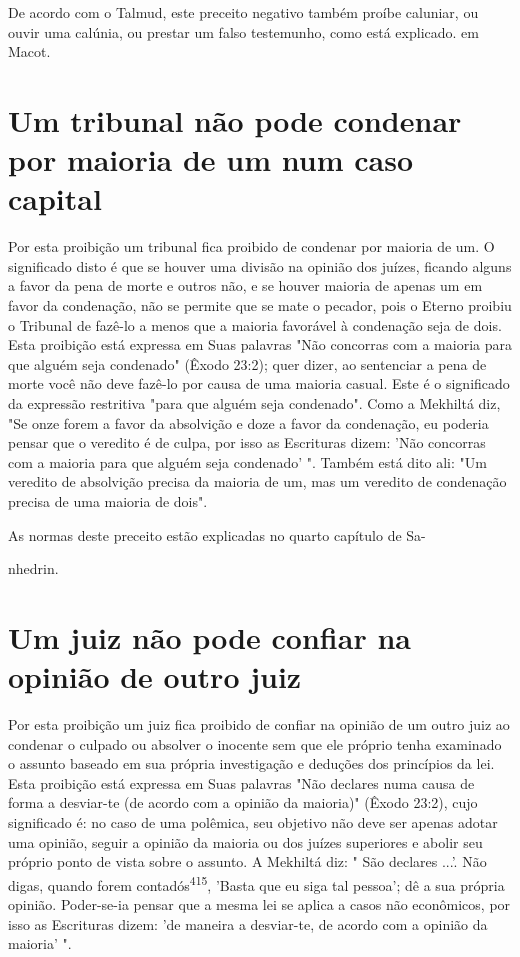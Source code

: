De acordo com o Talmud, este preceito negativo também proíbe ca­luniar,
ou ouvir uma calúnia, ou prestar um falso testemunho, como está
expli­cado. em Macot.

\section{Um tribunal não pode condenar por maioria de um num caso capital}

Por esta proibição um tribunal fica proibido de condenar por maio­ria de
um. O significado disto é que se houver uma divisão na opinião dos
juízes, ficando alguns a favor da pena de morte e outros não, e se
houver maioria de apenas um em favor da condenação, não se permite que
se mate o pecador, pois o Eterno proibiu o Tribunal de fazê-lo a menos
que a maioria favorável à conde­nação seja de dois. Esta proibição está
expressa em Suas palavras "Não concor­ras com a maioria para que alguém
seja condenado" (Êxodo 23:2); quer dizer, ao sentenciar a pena de morte
você não deve fazê-lo por causa de uma maioria casual. Este é o
significado da expressão restritiva "para que alguém seja conde­nado".
Como a Mekhiltá diz, "Se onze forem a favor da absolvição e doze a
fa­vor da condenação, eu poderia pensar que o veredito é de culpa, por
isso as Escrituras dizem: 'Não concorras com a maioria para que alguém
seja condena­do' ". Também está dito ali: "Um veredito de absolvição
precisa da maioria de um, mas um veredito de condenação precisa de uma
maioria de dois".


As normas deste preceito estão explicadas no quarto capítulo de Sa-


nhedrin.

\section{Um juiz não pode confiar na opinião de outro juiz}

Por esta proibição um juiz fica proibido de confiar na opinião de um
outro juiz ao condenar o culpado ou absolver o inocente sem que ele
próprio tenha examinado o assunto baseado em sua própria investigação e
deduções dos princípios da lei. Esta proibição está expressa em Suas
palavras "Não decla­res numa causa de forma a desviar-te (de acordo com
a opinião da maioria)" (Êxodo 23:2), cujo significado é: no caso de uma
polêmica, seu objetivo não deve ser apenas adotar uma opinião, seguir a
opinião da maioria ou dos juízes superiores e abolir seu próprio ponto
de vista sobre o assunto. A Mekhiltá diz: " São declares ...'. Não
digas, quando forem contadós\textsuperscript{415}, 'Basta que eu siga
tal pessoa'; dê a sua própria opinião. Poder-se-ia pensar que a mesma
lei se apli­ca a casos não econômicos, por isso as Escrituras dizem: 'de
maneira a desviar-te, de acordo com a opinião da maioria' ".

